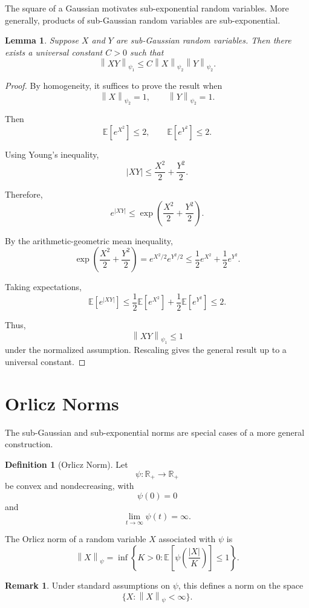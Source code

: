 \documentclass[12pt,oneside]{book}
\numberwithin{equation}{section}
\theoremstyle{definition}
\newtheorem{definition}{Definition}[section]
\newtheorem{remark}{Remark}[section]
\theoremstyle{plain}
\newtheorem{lemma}{Lemma}[section]
\theoremstyle{remark}
\newcommand{\R}{\mathbb{R}}
\newcommand{\E}{\mathbb{E}}
\newcommand{\norm}[1]{\left\lVert #1 \right\rVert}
\begin{document}
The square of a Gaussian motivates sub-exponential random variables. More generally, products of sub-Gaussian random variables are sub-exponential.

\begin{lemma}
Suppose $X$ and $Y$ are sub-Gaussian random variables. Then there exists a universal constant $C>0$ such that
\[
\norm{XY}_{\psi_1}
\leq
C\norm{X}_{\psi_2}\norm{Y}_{\psi_2}.
\]
\end{lemma}

\begin{proof}
By homogeneity, it suffices to prove the result when
\[
\norm{X}_{\psi_2}=1,
\qquad
\norm{Y}_{\psi_2}=1.
\]

Then
\[
\E[e^{X^2}]\leq 2,
\qquad
\E[e^{Y^2}]\leq 2.
\]

Using Young's inequality,
\[
|XY|
\leq
\frac{X^2}{2}
+
\frac{Y^2}{2}.
\]

Therefore,
\[
e^{|XY|}
\leq
\exp\left(
\frac{X^2}{2}
+
\frac{Y^2}{2}
\right).
\]

By the arithmetic-geometric mean inequality,
\[
\exp\left(
\frac{X^2}{2}
+
\frac{Y^2}{2}
\right)
=
e^{X^2/2}e^{Y^2/2}
\leq
\frac{1}{2}e^{X^2}
+
\frac{1}{2}e^{Y^2}.
\]

Taking expectations,
\[
\E[e^{|XY|}]
\leq
\frac{1}{2}\E[e^{X^2}]
+
\frac{1}{2}\E[e^{Y^2}]
\leq
2.
\]

Thus,
\[
\norm{XY}_{\psi_1}
\leq
1
\]
under the normalized assumption. Rescaling gives the general result up to a universal constant.
\end{proof}

\section{Orlicz Norms}

The sub-Gaussian and sub-exponential norms are special cases of a more general construction.

\begin{definition}[Orlicz Norm]
Let
\[
\psi:\R_+\to\R_+
\]
be convex and nondecreasing, with
\[
\psi(0)=0
\]
and
\[
\lim_{t\to\infty}\psi(t)=\infty.
\]

The Orlicz norm of a random variable $X$ associated with $\psi$ is
\[
\norm{X}_{\psi}
=
\inf\left\{
K>0:
\E\left[
\psi\left(
\frac{|X|}{K}
\right)
\right]
\leq
1
\right\}.
\]
\end{definition}

\begin{remark}
Under standard assumptions on $\psi$, this defines a norm on the space
\[
\{X:\norm{X}_{\psi}<\infty\}.
\]
\end{remark}
\end{document}
